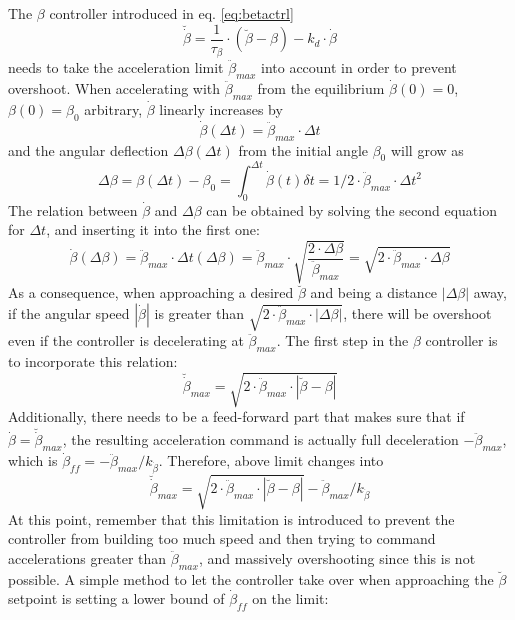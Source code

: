 \documentclass{article}
\begin{document}
The $\beta$ controller introduced in eq. \ref{eq:betactrl}
\[
\breve{\dot{\beta}} = \frac{1}{\tau_{\beta}} \cdot \left( \breve{\beta} - \beta \right) - k_d \cdot \dot{\beta}
\]
needs to take the acceleration limit $\ddot{\beta}_{max}$ into account in order to prevent overshoot.
When accelerating with $\ddot{\beta}_{max}$ from the equilibrium $\dot{\beta}(0) = 0$, $\beta(0) = \beta_0$ arbitrary, $\dot{\beta}$ linearly increases by
\[
\dot{\beta}(\Delta t) = \ddot{\beta}_{max} \cdot \Delta t
\]
and the angular deflection $\Delta \beta(\Delta t)$ from the initial angle $\beta_0$ will grow as
\[
\Delta \beta = \beta(\Delta t) - \beta_0 = \int_0^{\Delta t}{\dot{\beta}(t) \delta t} = 1/2 \cdot \ddot{\beta}_{max} \cdot \Delta t^2
\]
The relation between $\dot{\beta}$ and $\Delta \beta$ can be obtained by solving the second equation for $\Delta t$, and inserting it into the first one:
\begin{equation}
\dot{\beta}(\Delta \beta) = \ddot{\beta}_{max} \cdot \Delta t(\Delta \beta) = \ddot{\beta}_{max} \cdot \sqrt{\frac{2 \cdot \Delta \beta}{\ddot{\beta}_{max}}} = \sqrt{2 \cdot \ddot{\beta}_{max} \cdot \Delta \beta }
\end{equation}
As a consequence, when approaching a desired $\breve{\beta}$ and being a distance $|\Delta \beta|$ away, if the angular speed $|\dot{\beta}|$ is greater than $\sqrt{2 \cdot \ddot{\beta}_{max} \cdot |\Delta \beta|}$, there will be overshoot even if the controller is decelerating at $\ddot{\beta}_{max}$.
The first step in the $\beta$ controller is to incorporate this relation:
\begin{equation}
\breve{\dot{\beta}}_{max} = \sqrt{2 \cdot \ddot{\beta}_{max} \cdot |\breve{\beta} - \beta|}
\end{equation}
Additionally, there needs to be a feed-forward part that makes sure that if $\dot{\beta} = \breve{\dot{\beta}}_{max}$, the resulting acceleration command is actually full deceleration $-\ddot{\beta}_{max}$, which is $\dot{\beta}_{ff} = -\ddot{\beta}_{max} / k_{\dot{\beta}}$.
Therefore, above limit changes into
\begin{equation}
\breve{\dot{\beta}}_{max} = \sqrt{2 \cdot \ddot{\beta}_{max} \cdot |\breve{\beta} - \beta|} - \ddot{\beta}_{max} / k_{\dot{\beta}}
\end{equation}
At this point, remember that this limitation is introduced to prevent the controller from building too much speed and then trying to command accelerations greater than $\ddot{\beta}_{max}$, and massively overshooting since this is not possible.
A simple method to let the controller take over when approaching the $\breve{\beta}$ setpoint is setting a lower bound of $\dot{\beta}_{ff}$ on the limit:
\end{document}
